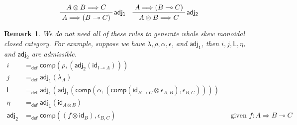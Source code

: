 \documentclass{article}
\newtheorem{remark}[theorem]{Remark}
\newcommand{\id}{\mathsf{id}}
\newcommand{\ot}{\otimes}
\newcommand{\lolli}{\multimap}
\newcommand{\I}{\mathsf{I}}
\newcommand{\msfL}{\mathsf{L}}
\newcommand{\defeq}{=_{\mathsf{def}}}
\newcommand{\comp}{\mathsf{comp}}
\begin{document}
\begin{displaymath}
  \prftree[r]{$\mathsf{adj_1}$}
  {
  A\otimes B\Longrightarrow C
  }
  {
  A\Longrightarrow (B\multimap C)
  }
  \quad
  \prftree[r]{$\mathsf{adj_2}$}
  {
  A\Longrightarrow (B\multimap C)
  }
  {
  A\otimes B\Longrightarrow C
  }
\end{displaymath}
\begin{remark}
  We do not need all of these rules to generate whole skew monoidal closed category.
  For example, suppose we have $\lambda , \rho , \alpha , \epsilon$, and $\mathsf{adj_1}$, then $i, j, \mathsf{L}, \eta$, and  $\mathsf{adj_2}$ are admissible.
  \begin{align*}
    i &\defeq \mathsf{comp} (\rho ,  (\mathsf{adj_2} (\id_{\I \lolli A})))
    \\
    j &\defeq \mathsf{adj_1} (\lambda_{A})
    \\
    \msfL &\defeq \mathsf{adj_1} (\mathsf{adj_1} (\mathsf{comp} (\alpha , (\mathsf{comp} (\id_{B \lolli C} \ot \epsilon_{A,B}) , \epsilon_{B,C}))))
    \\
    \eta &\defeq \mathsf{adj_1} (\id_{A \ot B})
    \\
    \mathsf{adj_2} &\defeq \comp ((f \ot \id_{B}), \epsilon_{B,C}) &&\text{given } f : A \Longrightarrow B \lolli C
  \end{align*}
\end{remark}
\end{document}
